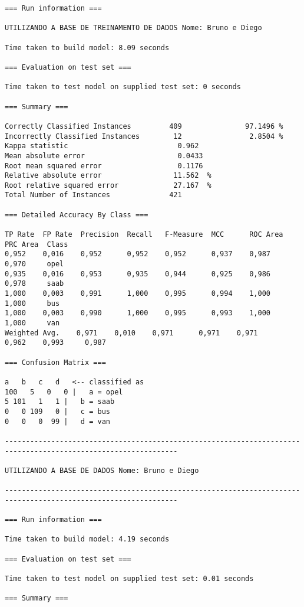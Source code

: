 \documentclass[
	article,			%
	11pt,				%
	oneside,			%
	a4paper,			%
	english,			%
	brazil,				%
	sumario=tradicional
	]{abntex2}
\begin{document}
\begin{lstlisting}
=== Run information ===

UTILIZANDO A BASE DE TREINAMENTO DE DADOS Nome: Bruno e Diego

Time taken to build model: 8.09 seconds

=== Evaluation on test set ===

Time taken to test model on supplied test set: 0 seconds

=== Summary ===

Correctly Classified Instances         409               97.1496 %
Incorrectly Classified Instances        12                2.8504 %
Kappa statistic                          0.962 
Mean absolute error                      0.0433
Root mean squared error                  0.1176
Relative absolute error                 11.562  %
Root relative squared error             27.167  %
Total Number of Instances              421     

=== Detailed Accuracy By Class ===

TP Rate  FP Rate  Precision  Recall   F-Measure  MCC      ROC Area  PRC Area  Class
0,952    0,016    0,952      0,952    0,952      0,937    0,987     0,970     opel
0,935    0,016    0,953      0,935    0,944      0,925    0,986     0,978     saab
1,000    0,003    0,991      1,000    0,995      0,994    1,000     1,000     bus
1,000    0,003    0,990      1,000    0,995      0,993    1,000     1,000     van
Weighted Avg.    0,971    0,010    0,971      0,971    0,971      0,962    0,993     0,987     

=== Confusion Matrix ===

a   b   c   d   <-- classified as
100   5   0   0 |   a = opel
5 101   1   1 |   b = saab
0   0 109   0 |   c = bus
0   0   0  99 |   d = van

---------------------------------------------------------------------------------------------------------------

UTILIZANDO A BASE DE DADOS Nome: Bruno e Diego

---------------------------------------------------------------------------------------------------------------

=== Run information ===

Time taken to build model: 4.19 seconds

=== Evaluation on test set ===

Time taken to test model on supplied test set: 0.01 seconds

=== Summary ===


\end{lstlisting}
\end{document}
